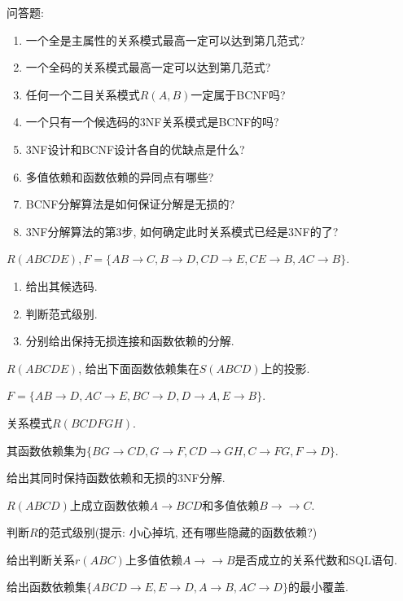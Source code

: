 \begin{problemset}
  \item 问答题:
  \begin{enumerate}
      \item 一个全是主属性的关系模式最高一定可以达到第几范式?
      \item 一个全码的关系模式最高一定可以达到第几范式?
      \item 任何一个二目关系模式$R (A, B)$一定属于BCNF吗?
      \item 一个只有一个候选码的3NF关系模式是BCNF的吗?
      \item 3NF设计和BCNF设计各自的优缺点是什么?
      \item 多值依赖和函数依赖的异同点有哪些?
      \item BCNF分解算法是如何保证分解是无损的?
      \item 3NF分解算法的第3步, 如何确定此时关系模式已经是3NF的了?
  \end{enumerate}
  \item $R (ABCDE), F =\{AB \rightarrow C, B \rightarrow D, CD
\rightarrow E, CE \rightarrow B, AC \rightarrow B\}$.
\begin{enumerate}
  \item 给出其候选码.
  
  \item 判断范式级别.
  
  \item 分别给出保持无损连接和函数依赖的分解.
\end{enumerate}
  \item $R ({ABCDE})$, 给出下面函数依赖集在$S
({ABCD})$上的投影.

$F =\{{AB} \rightarrow D, {AC} \rightarrow E, {BC} \rightarrow
D, D \rightarrow A, E \rightarrow B\}$.

  \item 关系模式$R ({BCDFGH})$.

其函数依赖集为$\{{BG} \rightarrow {CD}, G \rightarrow F, {CD} \rightarrow {GH}, C \rightarrow {FG}, F \rightarrow D\}$.

给出其同时保持函数依赖和无损的3NF分解.

  \item $R ({ABCD})$上成立函数依赖$A \rightarrow
{BCD}$和多值依赖$B \rightarrow \rightarrow C$.

判断$R$的范式级别(提示: 小心掉坑, 还有哪些隐藏的函数依赖?)

  \item 给出判断关系$r ({ABC})$上多值依赖$A \rightarrow \rightarrow
B$是否成立的关系代数和SQL语句.

  \item 给出函数依赖集$\{{ABCD} \rightarrow E, E \rightarrow D, A
\rightarrow B, {AC} \rightarrow D\}$的最小覆盖.
\end{problemset}
